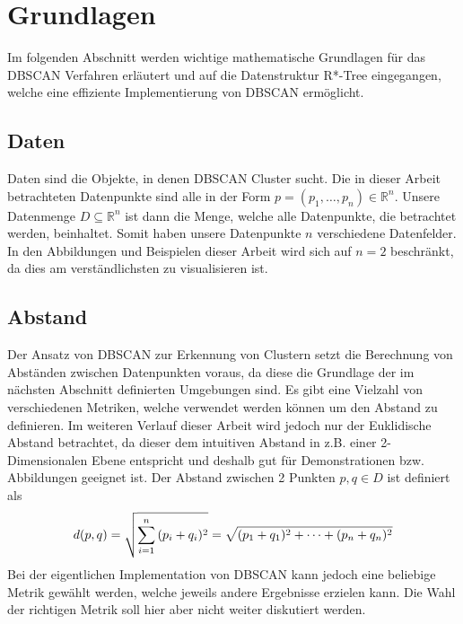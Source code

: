 \documentclass{lni}
\begin{document}
%
%

\section{Grundlagen}
\label{sec:grund}
Im folgenden Abschnitt werden wichtige mathematische Grundlagen für das DBSCAN Verfahren erläutert und auf die Datenstruktur R*-Tree eingegangen, welche eine effiziente Implementierung von DBSCAN ermöglicht.


\subsection{Daten}
Daten sind die Objekte, in denen DBSCAN Cluster sucht. Die in dieser Arbeit betrachteten Datenpunkte sind alle in der Form $p = (p_1, \dots, p_n) \in \mathbb{R}^n$.
Unsere Datenmenge $D \subseteq \mathbb{R}^n$ ist dann die Menge, welche alle Datenpunkte, die betrachtet werden, beinhaltet. Somit haben unsere Datenpunkte $n$ verschiedene Datenfelder. In den Abbildungen und Beispielen dieser Arbeit wird sich auf $n=2$ beschränkt, da dies am verständlichsten zu visualisieren ist.


\subsection{Abstand}
\label{sec:abstand}
Der Ansatz von DBSCAN zur Erkennung von Clustern setzt die Berechnung von Abständen zwischen Datenpunkten voraus, da diese die Grundlage der im nächsten Abschnitt definierten Umgebungen sind. Es gibt eine Vielzahl von verschiedenen Metriken, welche verwendet werden können um den Abstand zu definieren. Im weiteren Verlauf dieser Arbeit wird jedoch nur der Euklidische Abstand betrachtet, da dieser dem intuitiven Abstand in z.B. einer 2-Dimensionalen Ebene entspricht und deshalb gut für Demonstrationen bzw. Abbildungen geeignet ist. Der Abstand zwischen 2 Punkten $p,q \in D$ ist definiert als
\begin{align}
    d(p,q) = \sqrt{\sum_{i=1}^{n}{(p_i+q_i)^2}} = \sqrt{(p_1+q_1)^2 + \dots + (p_n+q_n)^2} \notag
\end{align}
Bei der eigentlichen Implementation von DBSCAN kann jedoch eine beliebige Metrik gewählt werden, welche jeweils andere Ergebnisse erzielen kann.
Die Wahl der richtigen Metrik soll hier aber nicht weiter diskutiert werden.

\end{document}
